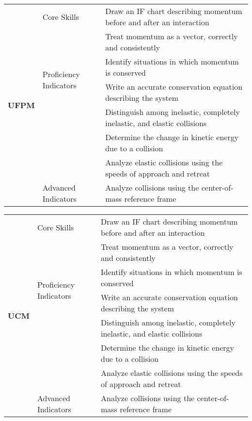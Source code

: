 \centering
{\footnotesize \begin{tabular}{| p{.35 cm} | p{1.7 cm} | p{14.3 cm} | }
\hline
\multirow{8}{*}{\begin{sideways}\parbox{4mm}{{\large{\bf UFPM}}}\end{sideways}}  &Core Skills 		& Draw an IF chart describing momentum before and after an interaction  \\ \cline{3-3}
& 					& Treat momentum as a vector, correctly and consistently  \\ \cline{2-3}					
& \multirow{2}{*}{\parbox{1.7cm}{Proficiency Indicators}}	& Identify situations in which momentum is conserved \\ \cline{3-3}
&					& Write an accurate conservation equation describing the system \\ \cline{3-3}
& 					& Distinguish among inelastic, completely inelastic, and elastic collisions \\ \cline{3-3}
& 					& Determine the change in kinetic energy due to a collision \\ \cline{3-3}
&					& Analyze elastic collisions using the speeds of approach and retreat \\ \cline{2-3}
& Advanced Indicators	& Analyze collisions using the center-of-mass reference frame \\ \hline
\end{tabular} }
\vspace{2 mm}


\centering
{\footnotesize \begin{tabular}{| p{.35 cm} | p{1.7 cm} | p{14.3 cm} | }
\hline
\multirow{8}{*}{\begin{sideways}\parbox{4mm}{{\large{\bf UCM}}}\end{sideways}}  &Core Skills 		& Draw an IF chart describing momentum before and after an interaction  \\ \cline{3-3}
& 					& Treat momentum as a vector, correctly and consistently  \\ \cline{2-3}					
& \multirow{2}{*}{\parbox{1.7cm}{Proficiency Indicators}}	& Identify situations in which momentum is conserved \\ \cline{3-3}
&					& Write an accurate conservation equation describing the system \\ \cline{3-3}
& 					& Distinguish among inelastic, completely inelastic, and elastic collisions \\ \cline{3-3}
& 					& Determine the change in kinetic energy due to a collision \\ \cline{3-3}
&					& Analyze elastic collisions using the speeds of approach and retreat \\ \cline{2-3}
& Advanced Indicators	& Analyze collisions using the center-of-mass reference frame \\ \hline
\end{tabular} }
\vspace{2 mm}


